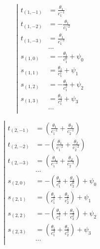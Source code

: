 \begin{equation*} \left| \begin{aligned}
t_{(1,-1)} &=
  \frac{\theta_1}{c_1^{-1}} \\
%
t_{(1,-2)} &=
  - \frac{\theta_1}{c_1^{-2}} \\
%
t_{(1,-3)} &=
  \frac{\theta_1}{c_1^{-3}} \\
%
&\ldots \\
%
s_{(1,0)} &=
- \frac{\theta_1}{c_1^0}
+ \psi_0 \\
%
s_{(1,1)} &=
  \frac{\theta_1}{c_1^1}
+ \psi_1 \\
%
s_{(1,2)} &=
- \frac{\theta_1}{c_1^2}
+ \psi_2 \\
%
s_{(1,3)} &=
  \frac{\theta_1}{c_1^3}
+ \psi_3 \\
%
&\ldots \\
\end{aligned} \right. \end{equation*}

\begin{equation*} \left| \begin{aligned}
t_{(2,-1)} &=
  \left(
  \frac{\theta_1}{c_1^{-1}}
+ \frac{\theta_2}{c_2^{-1}} \right) \\
%
t_{(2,-2)} &=
- \left(
  \frac{\theta_1}{c_1^{-2}}
+ \frac{\theta_2}{c_2^{-2}} \right) \\
%
t_{(2,-3)} &=
  \left(
  \frac{\theta_1}{c_1^{-3}}
+ \frac{\theta_2}{c_2^{-3}} \right) \\
%
&\ldots \\
%
s_{(2,0)} &=
- \left(
  \frac{\theta_1}{c_1^0}
+ \frac{\theta_2}{c_2^0} \right)
+ \psi_0 \\
%
s_{(2,1)} &=
  \left(
  \frac{\theta_1}{c_1^1}
+ \frac{\theta_2}{c_2^1} \right)
+ \psi_1 \\
%
s_{(2,2)} &=
- \left(
  \frac{\theta_1}{c_1^2}
+ \frac{\theta_2}{c_2^2} \right)
+ \psi_2 \\
%
s_{(2,3)} &=
  \left(
  \frac{\theta_1}{c_1^3}
+ \frac{\theta_2}{c_2^3} \right)
+ \psi_3 \\
%
&\ldots \\
\end{aligned} \right. \end{equation*}

